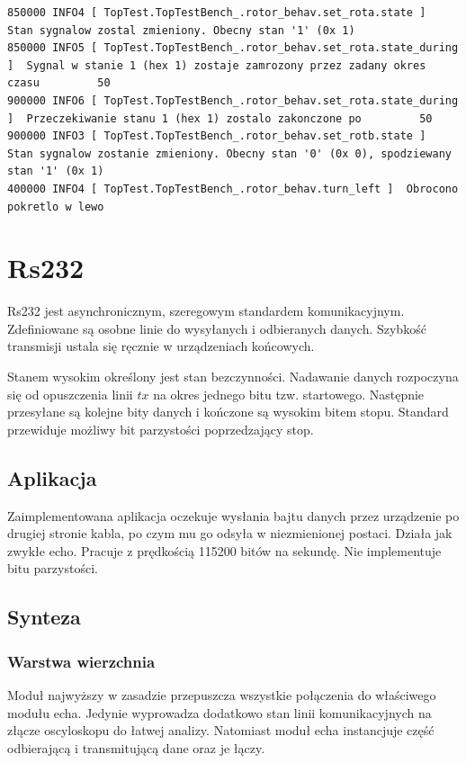 \documentclass[a4paper,12pt]{article}
\begin{document}
\begin{lstlisting}
850000 INFO4 [ TopTest.TopTestBench_.rotor_behav.set_rota.state ]  Stan sygnalow zostal zmieniony. Obecny stan '1' (0x 1)
850000 INFO5 [ TopTest.TopTestBench_.rotor_behav.set_rota.state_during ]  Sygnal w stanie 1 (hex 1) zostaje zamrozony przez zadany okres czasu         50
900000 INFO6 [ TopTest.TopTestBench_.rotor_behav.set_rota.state_during ]  Przeczekiwanie stanu 1 (hex 1) zostalo zakonczone po         50
900000 INFO3 [ TopTest.TopTestBench_.rotor_behav.set_rotb.state ]  Stan sygnalow zostanie zmieniony. Obecny stan '0' (0x 0), spodziewany stan '1' (0x 1)
400000 INFO4 [ TopTest.TopTestBench_.rotor_behav.turn_left ]  Obrocono pokretlo w lewo
\end{lstlisting}


\newpage
\section{Rs232}

Rs232 jest asynchronicznym, szeregowym standardem komunikacyjnym. Zdefiniowane są osobne linie do wysyłanych i odbieranych danych. Szybkość transmisji ustala się ręcznie w urządzeniach końcowych.

Stanem wysokim określony jest stan bezczynności. Nadawanie danych rozpoczyna się od opuszczenia linii $tx$ na okres jednego bitu tzw. startowego. Następnie przesyłane są kolejne bity danych i kończone są wysokim bitem stopu. Standard przewiduje możliwy bit parzystości poprzedzający stop.

\subsection{Aplikacja}
Zaimplementowana aplikacja oczekuje wysłania bajtu danych przez urządzenie po drugiej stronie kabla, po czym mu go odsyła w niezmienionej postaci. Działa jak zwykłe echo. Pracuje z prędkością 115200 bitów na sekundę. Nie implementuje bitu parzystości.

\subsection{Synteza}

\subsubsection{Warstwa wierzchnia}
Moduł najwyższy w zasadzie przepuszcza wszystkie połączenia do właściwego modułu echa. Jedynie wyprowadza dodatkowo stan linii komunikacyjnych na złącze oscyloskopu do łatwej analizy. Natomiast moduł echa instancjuje część odbierającą i transmitującą dane oraz je łączy.

\end{document}
